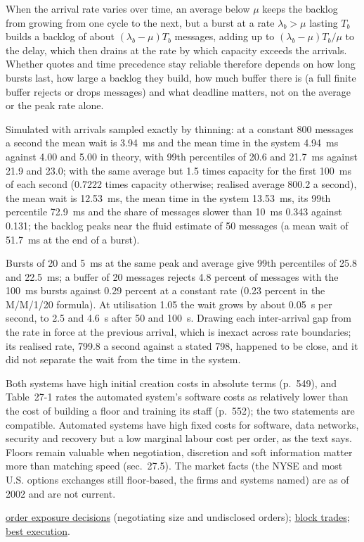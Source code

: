 \begin{qfdefinition}
When the arrival rate varies over time, an average below $\mu$ keeps the backlog from growing from one cycle to the next, but a burst at a rate $\lambda_b>\mu$ lasting $T_b$ builds a backlog of about $(\lambda_b-\mu)T_b$ messages, adding up to $(\lambda_b-\mu)T_b/\mu$ to the delay, which then drains at the rate by which capacity exceeds the arrivals. Whether quotes and time precedence stay reliable therefore depends on how long bursts last, how large a backlog they build, how much buffer there is (a full finite buffer rejects or drops messages) and what deadline matters, not on the average or the peak rate alone.

Simulated with arrivals sampled exactly by thinning: at a constant 800 messages a second the mean wait is 3.94~ms and the mean time in the system 4.94~ms against 4.00 and 5.00 in theory, with 99th percentiles of 20.6 and 21.7~ms against 21.9 and 23.0; with the same average but 1.5 times capacity for the first 100~ms of each second (0.7222 times capacity otherwise; realised average 800.2 a second), the mean wait is 12.53~ms, the mean time in the system 13.53~ms, its 99th percentile 72.9~ms and the share of messages slower than 10~ms 0.343 against 0.131; the backlog peaks near the fluid estimate of 50 messages (a mean wait of 51.7~ms at the end of a burst).

Bursts of 20 and 5~ms at the same peak and average give 99th percentiles of 25.8 and 22.5~ms; a buffer of 20 messages rejects 4.8 percent of messages with the 100~ms bursts against 0.29 percent at a constant rate (0.23 percent in the M/M/1/20 formula). At utilisation 1.05 the wait grows by about 0.05~s per second, to 2.5 and 4.6~s after 50 and 100~s. Drawing each inter-arrival gap from the rate in force at the previous arrival, which is inexact across rate boundaries; its realised rate, 799.8 a second against a stated 798, happened to be close, and it did not separate the wait from the time in the system.

 Both systems have high initial creation costs in absolute terms (p.~549), and Table~27-1 rates the automated system's software costs as relatively lower than the cost of building a floor and training its staff (p.~552); the two statements are compatible. Automated systems have high fixed costs for software, data networks, security and recovery but a low marginal labour cost per order, as the text says. Floors remain valuable when negotiation, discretion and soft information matter more than matching speed (sec.~27.5). The market facts (the NYSE and most U.S. options exchanges still floor-based, the firms and systems named) are as of 2002 and are not current.

 \hyperref[def:order-exposure-decisions]{order exposure decisions} (negotiating size and undisclosed orders); \hyperref[def:block-trade]{block trades}; \hyperref[def:best-execution]{best execution}.

\end{qfdefinition}
